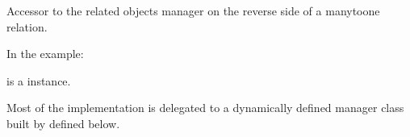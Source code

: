 \documentclass[letterpaper,10pt,french]{sphinxmanual}
\begin{document}
\begin{fulllineitems}

\begin{fulllineitems}
\label{\detokenize{main/model:main.models.Enseignant.DoesNotExist}}
\pysigstartsignatures
{}
\pysigstopsignatures
\end{fulllineitems}


\begin{fulllineitems}
\label{\detokenize{main/model:main.models.Enseignant.MultipleObjectsReturned}}
\pysigstartsignatures
{}
\pysigstopsignatures
\end{fulllineitems}


\begin{fulllineitems}
\label{\detokenize{main/model:main.models.Enseignant.fichedepaie_set}}
\pysigstartsignatures
{}
\pysigstopsignatures
\sphinxAtStartPar
Accessor to the related objects manager on the reverse side of a
many\sphinxhyphen{}to\sphinxhyphen{}one relation.

\sphinxAtStartPar
In the example:

\begin{sphinxVerbatim}[commandchars=\\\{\}]
 
       
\end{sphinxVerbatim}

\sphinxAtStartPar
{} is a  instance.

\sphinxAtStartPar
Most of the implementation is delegated to a dynamically defined manager
class built by  defined below.


\end{fulllineitems}
\end{fulllineitems}
\end{document}
